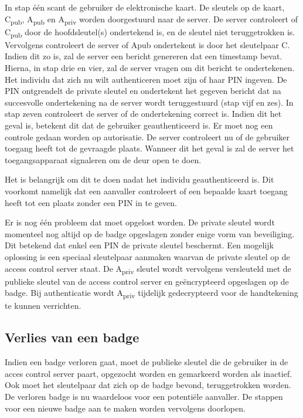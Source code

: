 In stap één scant de gebruiker de elektronische kaart. De sleutels op de kaart,
C\textsubscript{pub}, A\textsubscript{pub} en A\textsubscript{priv} worden
doorgestuurd naar de server. De server controleert of C\textsubscript{pub} door
de hoofdsleutel(s) ondertekend is, en de sleutel niet teruggetrokken is.
Vervolgens controleert de server of Apub ondertekent is door het sleutelpaar C.
Indien dit zo is, zal de server een bericht genereren dat een timestamp bevat.
Hierna, in stap drie en vier, zal de server vragen om dit bericht te
ondertekenen. Het individu dat zich nu wilt authenticeren moet zijn of haar PIN
ingeven. De PIN ontgrendelt de private sleutel en ondertekent het gegeven
bericht dat na succesvolle ondertekening na de server wordt teruggestuurd (stap
vijf en zes). In stap zeven controleert de server of de ondertekening correct
is. Indien dit het geval is, betekent dit dat de gebruiker geauthenticeerd is.
Er moet nog een controle gedaan worden op autorisatie. De server controleert nu
of de gebruiker toegang heeft tot de gevraagde plaats. Wanneer dit het geval is
zal de server het toegangsapparaat signaleren om de deur open te doen.

Het is belangrijk om dit te doen nadat het individu geauthenticeerd is. Dit
voorkomt namelijk dat een aanvaller controleert of een bepaalde kaart toegang
heeft tot een plaats zonder een PIN in te geven.

Er is nog één probleem dat moet opgelost worden. De private sleutel wordt
momenteel nog altijd op de badge opgeslagen zonder enige vorm van beveiliging.
Dit betekend dat enkel een PIN de private sleutel beschermt. Een mogelijk
oplossing is een speciaal sleutelpaar aanmaken waarvan de private sleutel op de
access control server staat. De A\textsubscript{priv} sleutel wordt vervolgens
versleuteld met de publieke sleutel van de access control server en
geëncrypteerd opgeslagen op de badge. Bij authenticatie wordt
A\textsubscript{priv} tijdelijk gedecrypteerd voor de handtekening te kunnen
verrichten.

\subsection{Verlies van een badge}

Indien een badge verloren gaat, moet de publieke sleutel die de gebruiker in de
acces control server paart, opgezocht worden en gemarkeerd worden als inactief.
Ook moet het sleutelpaar dat zich op de badge bevond, teruggetrokken worden. De
verloren badge is nu waardeloos voor een potentiële aanvaller. De stappen voor
een nieuwe badge aan te maken worden vervolgens doorlopen.

